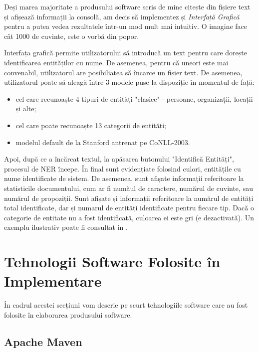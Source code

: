 Deși marea majoritate a produsului software scris de mine citește din fișiere text și afișează informații la consolă, am decis să implementez și \textit{Interfață Grafică} pentru a putea vedea rezultatele într-un mod mult mai intuitiv. O imagine face cât 1000 
de cuvinte, este o vorbă din popor.

Interfața grafică permite utilizatorului să introducă un text pentru care dorește identificarea entităților cu nume. De asemenea, pentru că uneori este mai convenabil, utilizatorul are posibiliatea să încarce un fișier text. De asemenea, utilizatorul poate să aleagă între 3 modele puse la dispoziție în momentul de față:
\begin{itemize}
\item  cel care recunoaște 4 tipuri de entități "clasice" - persoane, organizații, locații și alte;
\item cel care poate recunoaște 13 categorii de entități;
\item modelul default de la Stanford antrenat pe CoNLL-2003.
\end{itemize}

Apoi, după ce a încărcat textul, la apăsarea butonului "Identifică Entități", procesul de NER începe. În final sunt evidențiate folosind culori, entitățile cu nume identificate de sistem. De asemenea, sunt afișate informații referitoare la statisticile documentului, cum ar fi număul de caractere, numărul de cuvinte, sau numărul de propoziții. Sunt afișate și informații referitoare la numărul de entități total identificate, dar și numarul de entități identificate pentru fiecare tip. Dacă o categorie de entitate nu a fost identificată, culoarea ei este gri (e dezactivată). Un exemplu ilustrativ poate fi consultat in .


\section{Tehnologii Software Folosite în Implementare}

În cadrul acestei secțiuni vom descrie pe scurt tehnologiile software care au fost folosite în elaborarea produsului software.

\subsection{Apache Maven}

